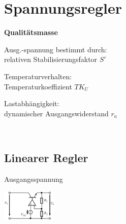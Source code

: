 \section{Spannungsregler}
  {\bf{Qualit\"atsmasse}}\\
  \begin{minipage}[t]{6cm}
    Ausg.-spannung bestimmt durch:\\
    relativen Stabilisierungsfaktor $S'$\\
  \end{minipage}
  \begin{minipage}[t]{6cm}
    Temperaturverhalten:\\
    Temperaturkoeffizient $TK_U$\\
  \end{minipage}
  \begin{minipage}[t]{6cm}
    Lastabh\"angigkeit:\\
    dynamischer Ausgangswiderstand $r_a$\\
  \end{minipage}\\ 
    
\subsection{Linearer Regler}
  \begin{minipage}[T]{14cm}
    Ausgangsspannung
    \hspace{13mm}\\
  \end{minipage}
  \begin{minipage}{5cm}
    \includegraphics[height=1.5cm]{./bilder/ReglerLinear.png}
  \end{minipage}\\
            
